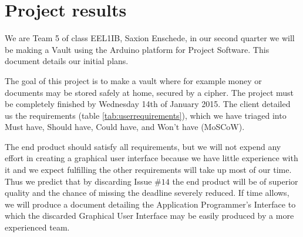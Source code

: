 \chapter{Project results}
We are Team 5 of class EEL1IB, Saxion Enschede, in our second quarter we will be making a Vault using the Arduino platform for Project Software. This document details our initial plans.

The goal of this project is to make a vault where for example money or documents may be stored safely at home, secured by a cipher. The project must be completely finished by Wednesday 14th of January 2015. The client detailed us the requirements (table \ref{tab:userrequirements}), which we have triaged into Must have, Should have, Could have, and Won't have (MoSCoW).

The end product should satisfy all requirements, but we will not expend any effort in creating a graphical user interface because we have little experience with it and we expect fulfilling the other requirements will take up most of our time. Thus we predict that by discarding Issue $\#14$ the end product will be of superior quality and the chance of missing the deadline severely reduced. If time allows, we will produce a document detailing the Application Programmer's Interface to which the discarded Graphical User Interface may be easily produced by a more experienced team.

